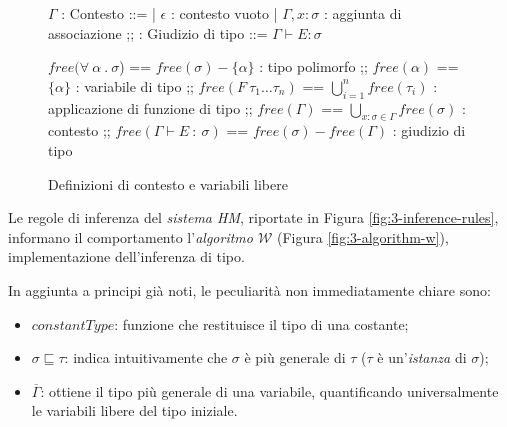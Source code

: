 \begin{figure}[H]
    \centering
    \vspace{4mm}
    \begin{spacedbnf}
        $\Gamma$ : \small{Contesto} ::=
        | $\epsilon$ : \small{contesto vuoto}
        | $\Gamma, x \colon \sigma$ : \small{aggiunta di associazione}
        ;;
        : \small{Giudizio di tipo} ::= $\Gamma \vdash E \colon \sigma$
    \end{spacedbnf}
    \par\vspace{10mm}
    \begin{spacedbnf}
        $free(\forall\ \alpha\ \mathord{.}\ \sigma$) == $free(\sigma) - \{\alpha\}$ : \small{tipo polimorfo}
        ;;
        $free(\alpha)$ == $\{\alpha\}$ : \small{variabile di tipo}
        ;;
        $free(F\ \tau_1\ldots\tau_n)$ == $\bigcup\limits_{i=1}^{n} free(\tau_i)$ : \small{applicazione di funzione di tipo}
        ;;
        $free(\Gamma)$ == $\bigcup\limits_{x\colon\sigma\in\Gamma} free(\sigma)$ : \small{contesto}
        ;;
        $free(\Gamma\vdash E\ \colon\ \sigma)$ == $free(\sigma) - free(\Gamma)$ : \small{giudizio di tipo}
    \end{spacedbnf}
    \caption{Definizioni di contesto e variabili libere}
    \label{fig:3-context-free-variables}
    \vspace{4mm}
\end{figure}

\newpage

\noindent Le regole di inferenza del \textit{sistema HM}, riportate in Figura \ref{fig:3-inference-rules},
informano il comportamento l'\textit{algoritmo $\mathcal{W}$} (Figura \ref{fig:3-algorithm-w}), implementazione dell'inferenza di tipo.

\noindent In aggiunta a principi già noti, le peculiarità non immediatamente chiare sono:
\begin{itemize}
    \item $constantType$: funzione che restituisce il tipo di una costante;
    \item $\sigma \sqsubseteq \tau$: indica intuitivamente che $\sigma$ è più generale di $\tau$
          ($\tau$ è un'\textit{istanza} di $\sigma$);
    \item $\overline{\Gamma}$: ottiene il tipo più generale di una variabile, quantificando universalmente le variabili libere del tipo iniziale.
\end{itemize}

